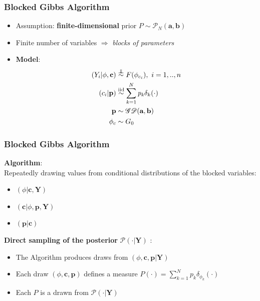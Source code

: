 \begin{frame} %
	\frametitle{Blocked Gibbs Algorithm}
	\begin{itemize}
	    \item Assumption: \textbf{finite-dimensional} prior  $P \sim  \mathscr{P}_{N}(\textbf{a},\textbf{b})$
	
        \item Finite number of variables $\Rightarrow$ \textit{blocks of parameters} \\
        \item \textbf{Model}:\\
        \begin{align*}
            (Y_{i}|\mathbf{\phi},\mathbf{c})&\indsim F(\phi_{c_{i}}) , \ i=1,..,n \\
            (c_{i}|\mathbf{p})&\iidsim\sum\limits_{k=1}^N \mathit{p_{k}}\delta_{k}(\cdot)\\
            \mathbf{p} &\sim \mathscr{GD}(\textbf{a},\textbf{b}) \\
            \mathbf{\phi}_{c} & \sim G_{0}
        \end{align*}



	\end{itemize}
\end{frame}




\begin{frame} %
	\frametitle{Blocked Gibbs Algorithm}
\textbf{Algorithm}: \\
Repeatedly drawing values from conditional distributions of the blocked variables:\\

\begin{itemize}
    \item $(\phi | \textbf{c}, \textbf{Y})$
    \item $(\textbf{c}| \phi,\textbf{p}, \textbf{Y})$
    \item $(\textbf{p}| \textbf{c})$

\end{itemize}

\textbf{Direct sampling of the posterior} $\mathscr{P}(\cdot|\mathbf{Y})$ :\\

\begin{itemize}
    \item The Algorithm produces draws from $(\phi,\textbf{c},\textbf{p}| \textbf{Y})$ \\
\item Each draw $(\phi,\textbf{c},\textbf{p})$ defines a measure $P(\cdot)= \sum\limits_{k=1}^N  \mathit{p_{k}}\delta_{\phi_{k}}(\cdot) $
\item Each $P$ is a drawn from $\mathscr{P}(\cdot|\mathbf{Y})$
\end{itemize}




\end{frame}

